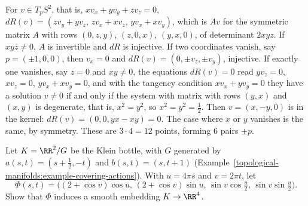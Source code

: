 \begin{solution}
For $v \in T_pS^2$, that is, $xv_x + yv_y + zv_z = 0$, $dR(v) = (zv_y + yv_z, \, zv_x + xv_z, \, yv_x + xv_y)$, which is $Av$ for the symmetric matrix $A$ with rows $(0, z, y)$, $(z, 0, x)$, $(y, x, 0)$, of determinant $2xyz$.
If $xyz \neq 0$, $A$ is invertible and $dR$ is injective. If two coordinates vanish, say $p = (\pm1, 0, 0)$, then $v_x = 0$ and $dR(v) = (0, \pm v_z, \pm v_y)$, injective. If exactly one vanishes, say $z = 0$ and $xy \neq 0$, the
equations $dR(v) = 0$ read $yv_z = 0$, $xv_z = 0$, $yv_x + xv_y = 0$, and with the tangency condition $xv_x + yv_y = 0$ they have a solution $v \neq 0$ if and only if the system with matrix with rows $(y, x)$ and $(x, y)$ is
degenerate, that is, $x^2 = y^2$, so $x^2 = y^2 = \frac12$. Then $v = (x, -y, 0)$ is in the kernel: $dR(v) = (0, 0, yx - xy) = 0$. The case where $x$ or $y$ vanishes is the same, by symmetry. These are $3 \cdot 4 = 12$ points,
forming $6$ pairs $\pm p$.
\end{solution}

\begin{exercise}\label{smooth-manifolds:exercise-klein-r4}
Let $K = \RR^2/G$ be the Klein bottle, with $G$ generated by $a(s, t) = (s + \frac12, -t)$ and $b(s, t) = (s, t + 1)$ (Example~\ref{topological-manifolds:example-covering-actions}). With $u = 4\pi s$ and $v = 2\pi t$, let
\[
\Phi(s, t) = \bigl((2 + \cos v)\cos u, \, (2 + \cos v)\sin u, \, \sin v\cos\tfrac u2, \, \sin v\sin\tfrac u2\bigr).
\]
Show that $\Phi$ induces a smooth embedding $K \to \RR^4$.
\end{exercise}


